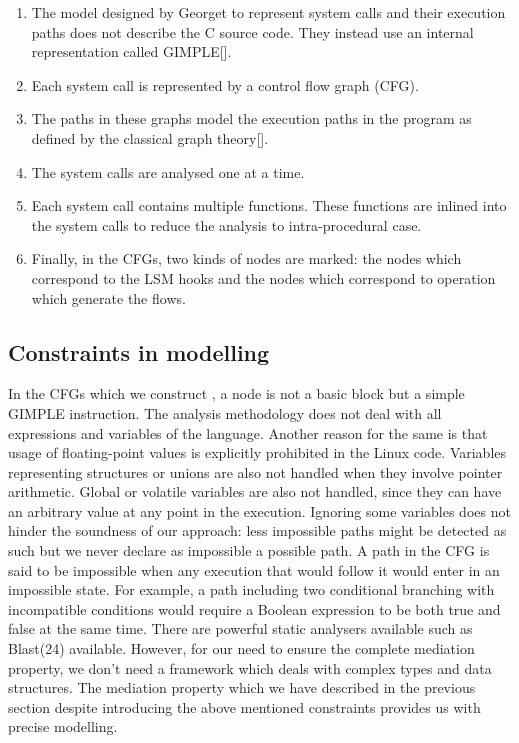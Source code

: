 \begin{enumerate}
	\item The model designed by Georget to represent system calls and their execution paths does not describe the C source code. They instead use an internal representation called GIMPLE[]. 
	\item Each system call is represented by a control flow graph (CFG).
	\item The paths in these graphs model the execution paths in the program as defined by the classical graph theory[].
	\item The system calls are analysed one at a time. 
	\item Each system call contains multiple functions. These functions are inlined into the system calls to reduce the analysis to intra-procedural case. 
	\item Finally, in the CFGs, two kinds of nodes are marked: the nodes which correspond to the LSM hooks and the nodes which correspond to operation which generate the flows. 
	\end{enumerate}

\subsection{Constraints in modelling}
In the CFGs which we construct , a node is not a basic block but a simple GIMPLE instruction. The analysis methodology does not deal with all expressions and variables of the language. Another reason for the same is that usage of floating-point values is explicitly prohibited in the Linux code. Variables representing structures or unions are also not handled when they involve pointer arithmetic. Global or volatile variables are also not handled, since they can have an arbitrary value at any point in the execution. Ignoring some variables does not hinder the soundness of
our approach: less impossible paths might be detected as such but
we never declare as impossible a possible path. A path in the CFG is said to be impossible when any execution
that would follow it would enter in an impossible state. For example,
a path including two conditional branching with incompatible
conditions would require a Boolean expression to be both true and
false at the same time. 
\vskip 0.1in
There are powerful static analysers available such as Blast(24) available. However, for our need to ensure the complete mediation property, we don't need a framework which deals with complex types and data structures. The mediation property which we have described in the previous section despite introducing the above mentioned constraints provides us with precise modelling.

